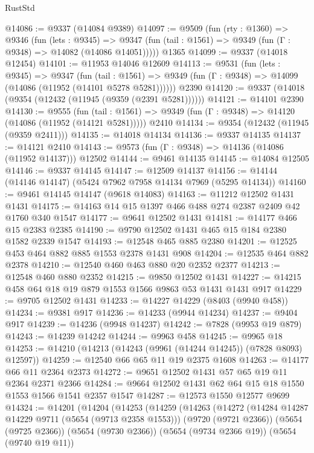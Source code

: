 \begin{lexlean}{RustStd}
\begin{coremodule}
@14086 := @9337 (@14084 @9389)
@14097 := @9509
    (fun (rty : @1360) =>
    @9346
      (fun (lets : @9345) =>
      @9347 (fun (tail : @1561) => @9349 (fun (Γ : @9348) => @14082 (@14086 @14051)))))
    @1365
@14099 := @9337 (@14018 @12454)
@14101 := @11953 @14046 @12609
@14113 := @9531
    (fun (lets : @9345) =>
    @9347
      (fun (tail : @1561) =>
      @9349 (fun (Γ : @9348) => @14099 (@14086 (@11952 (@14101 @5278 @5281))))))
    @2390
@14120 := @9337 (@14018 (@9354 (@12432 (@11945 (@9359 (@2391 @5281))))))
@14121 := @14101 @2390
@14130 := @9555
    (fun (tail : @1561) => @9349 (fun (Γ : @9348) => @14120 (@14086 (@11952 (@14121 @5281)))))
    @2410
@14134 := @9354 (@12432 (@11945 (@9359 @2411)))
@14135 := @14018 @14134
@14136 := @9337 @14135
@14137 := @14121 @2410
@14143 := @9573 (fun (Γ : @9348) => @14136 (@14086 (@11952 @14137))) @12502
@14144 := @9461 @14135
@14145 := @14084 @12505
@14146 := @9337 @14145
@14147 := @12509 @14137
@14156 := @14144 (@14146 @14147) (@5424 @7962 @7958 @14134 @7969 (@5295 @14134))
@14160 := @9461 @14145 @14147 (@9618 @14083)
@14163 := @11212 @12502 @1431 @1431
@14175 := @14163 @14 @15 @1397 @466 @488 @274 @2387 @2409 @42 @1760 @340 @1547
@14177 := @9641 @12502 @1431
@14181 := @14177 @466 @15 @2383 @2385
@14190 := @9790 @12502 @1431 @465 @15 @184 @2380 @1582 @2339 @1547
@14193 := @12548 @465 @885 @2380
@14201 := @12525 @453 @464 @882 @885 @1553 @2378 @1431 @908
@14204 := @12535 @464 @882 @2378
@14210 := @12540 @460 @463 @880 @20 @2352 @2377
@14213 := @12548 @460 @880 @2352
@14215 := @9850 @12502 @1431
@14227 := @14215 @458 @64 @18 @19 @879 @1553 @1566 @9863 @53 @1431 @1431 @917
@14229 := @9705 @12502 @1431
@14233 := @14227 @14229 (@8403 (@9940 @458))
@14234 := @9381 @917
@14236 := @14233 (@9944 @14234)
@14237 := @9404 @917
@14239 := @14236 (@9948 @14237)
@14242 := @7828 (@9953 @19 @879)
@14243 := @14239 @14242
@14244 := @9963 @458
@14245 := @9965 @18
@14253 := @14210 (@14213 (@14243 (@9961 (@14244 @14245)) (@7828 @8093) @12597))
@14259 := @12540 @66 @65 @11 @19 @2375 @1608
@14263 := @14177 @66 @11 @2364 @2373
@14272 := @9651 @12502 @1431 @57 @65 @19 @11 @2364 @2371 @2366
@14284 := @9664 @12502 @1431 @62 @64 @15 @18 @1550 @1553 @1566 @1541 @2357 @1547
@14287 := @12573 @1550 @12577 @9699
@14324 := @14201
    (@14204
      (@14253
        (@14259
          (@14263
            (@14272
              (@14284 @14287 @14229 @9711 (@5654 (@9713 @2358 @1553)))
              (@9720 (@9721 @2366))
              (@5654 (@9725 @2366))
              (@5654 (@9730 @2366))
              (@5654 (@9734 @2366 @19))
              (@5654 (@9740 @19 @11))

\end{coremodule}
\end{lexlean}
